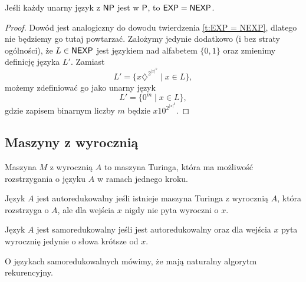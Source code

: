 \begin{theorem}
    Jeśli każdy unarny język z $\textsf{NP}$ jest w $\textsf{P}$, to $\textsf{EXP} = \textsf{NEXP}$.
\end{theorem}
\begin{proof}
    Dowód jest analogiczny do dowodu twierdzenia \ref{t:EXP = NEXP}, dlatego nie będziemy go tutaj powtarzać. Założymy jedynie dodatkowo (i bez straty ogólności), że $L \in \textsf{NEXP}$ jest językiem nad alfabetem $\{0, 1\}$ oraz zmienimy definicję języka $L'$. Zamiast
    \[ L' = \{x\diamondsuit^{2^{|x|^k}} \mid x \in L\}, \]
    możemy zdefiniować go jako unarny język
    \[ L' = \{0^m \mid x \in L\}, \]
    gdzie zapisem binarnym liczby $m$ będzie $x10^{2^{|x|^k}}$.
\end{proof}

\subsection{Maszyny z wyrocznią}

Maszyna $M$ z wyrocznią $A$ to maszyna Turinga, która ma możliwość rozstrzygania o języku $A$ w ramach jednego kroku.

\begin{definition}[autoredukcja]
    Język $A$ jest autoredukowalny jeśli istnieje maszyna Turinga z wyrocznią $A$, która rozstrzyga o $A$, ale dla wejścia $x$ nigdy nie pyta wyroczni o $x$.
\end{definition}

\begin{definition}[samoredukcja]
    Język $A$ jest samoredukowalny jeśli jest autoredukowalny oraz dla wejścia $x$ pyta wyrocznię jedynie o słowa krótsze od $x$.
\end{definition}

O językach samoredukowalnych mówimy, że mają naturalny algorytm rekurencyjny.

